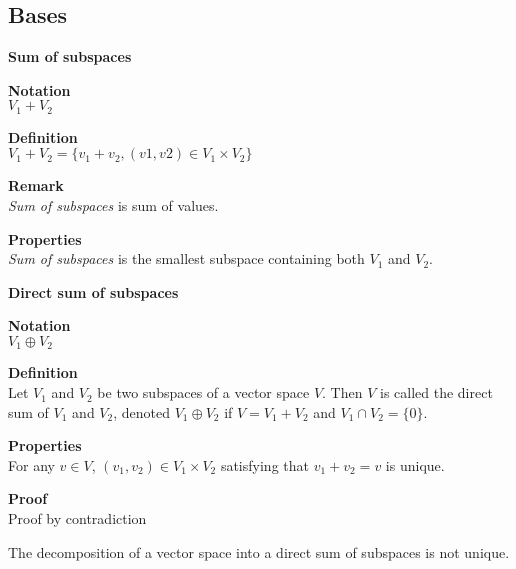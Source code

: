 \documentclass{article}
\begin{document}
\subsection{Bases}

\begin{framed}

    \textbf{Sum of subspaces}

    \begin{framed}
        \textbf{Notation}\\
        $V_{1}+V_{2}$
    \end{framed}

    \begin{framed}
        \textbf{Definition}\\
        $V_{1}+V_{2}=\{v_{1}+v_{2},(v1,v2)\in V_{1}\times V_{2}\}$
        \begin{framed}
        \textbf{Remark}\\
        \textit{Sum of subspaces} is sum of values.
        \end{framed}
    \end{framed}

    \begin{framed}
        \textbf{Properties}\\
        \textit{Sum of subspaces} is the smallest subspace containing both $V_{1}$ and $V_{2}$.
    \end{framed}

\end{framed}

\begin{framed}

    \textbf{Direct sum of subspaces}

    \begin{framed}
        \textbf{Notation}\\
        $V_{1}\oplus V_{2}$
    \end{framed}

    \begin{framed}
        \textbf{Definition}\\
        Let $V_{1}$ and $V_{2}$ be two subspaces of a vector space $V$. Then $V$ is called the direct sum of $V_{1}$ and $V_{2}$, denoted $V_{1} \oplus V_{2}$ if $V = V_{1}+V_{2}$ and $V_{1}\cap V_{2} = \{0\}$.
    \end{framed}

    \begin{framed}
        \textbf{Properties}\\
        For any $v\in V$, $(v_{1},v_{2})\in V_{1}\times V_{2}$ satisfying that $v_{1}+v_{2}=v$ is unique.
        \begin{framed}
            \textbf{Proof}\\
            Proof by contradiction
        \end{framed}
        The decomposition of a vector space into a direct sum of subspaces is not unique.
    \end{framed}

\end{framed}
\end{document}
